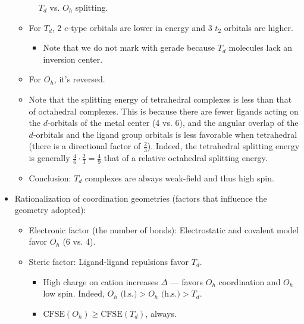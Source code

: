 \documentclass[../notes.tex]{subfiles}
\begin{document}
\begin{itemize}
\begin{figure}[h!]
        \caption{$T_d$ vs. $O_h$ splitting.}
        \label{fig:TdOhSplitting}
    \end{figure}
    \begin{itemize}
        \item For $T_d$, 2 $e$-type orbitals are lower in energy and 3 $t_2$ orbitals are higher.
        \begin{itemize}
            \item Note that we do not mark with gerade because $T_d$ molecules lack an inversion center.
        \end{itemize}
        \item For $O_h$, it's reversed.
        \item Note that the splitting energy of tetrahedral complexes is less than that of octahedral complexes. This is because there are fewer ligands acting on the $d$-orbitals of the metal center (4 vs. 6), and the angular overlap of the $d$-orbitals and the ligand group orbitals is less favorable when tetrahedral (there is a directional factor of $\frac{2}{3}$). Indeed, the tetrahedral splitting energy is generally $\frac{4}{6}\cdot\frac{2}{3}=\frac{4}{9}$ that of a relative octahedral splitting energy.
        \item Conclusion: $T_d$ complexes are always weak-field and thus high spin.
    \end{itemize}
    \item Rationalization of coordination geometries (factors that influence the geometry adopted):
    \begin{itemize}
        \item Electronic factor (the number of bonds): Electrostatic and covalent model favor $O_h$ (6 vs. 4).
        \item Steric factor: Ligand-ligand repulsions favor $T_d$.
        \begin{itemize}
            \item High charge on cation increases $\Delta$ --- favors $O_h$ coordination and $O_h$ low spin. Indeed, $O_h\text{ (l.s.)}>O_h\text{ (h.s.)}>T_d$.
            \item $\text{CFSE}(O_h)\geq\text{CFSE}(T_d)$, always.
        \end{itemize}

\end{itemize}
\end{itemize}
\end{document}
